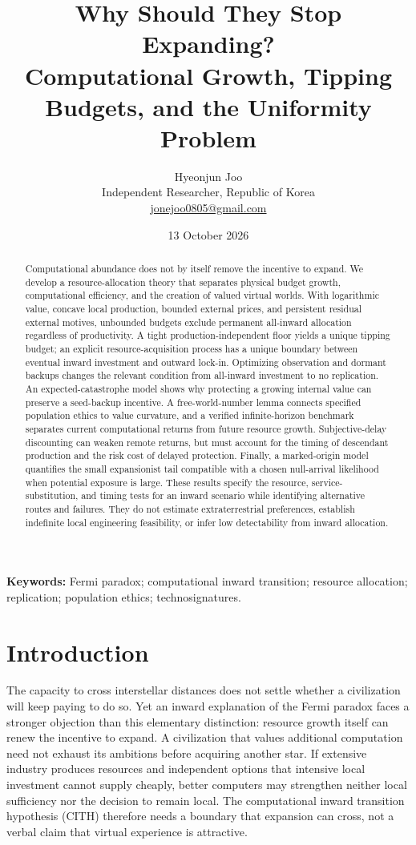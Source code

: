\documentclass[11pt,a4paper]{article}
\title{Why Should They Stop Expanding?\\[3pt]
\large Computational Growth, Tipping Budgets, and the Uniformity Problem}
\author{Hyeonjun Joo\\[3pt]\normalsize Independent Researcher, Republic of Korea\\
\normalsize\href{mailto:jonejoo0805@gmail.com}{jonejoo0805@gmail.com}}
\date{13 October 2026}
\theoremstyle{definition}\newtheorem{definition}{Definition}
\newcommand{\CITH}{\textsc{CITH}}
\begin{document}
\maketitle
\begin{abstract}
Computational abundance does not by itself remove the incentive to expand.
We develop a resource-allocation theory that separates physical budget
growth, computational efficiency, and the creation of valued virtual worlds.
With logarithmic value, concave local production, bounded external prices,
and persistent residual external motives, unbounded budgets exclude
permanent all-inward allocation regardless of productivity. A tight
production-independent floor yields a unique tipping budget; an explicit
resource-acquisition process has a unique boundary between eventual inward
investment and outward lock-in. Optimizing observation and dormant backups
changes the relevant condition from all-inward investment to no replication.
An expected-catastrophe model shows why protecting a growing internal value
can preserve a seed-backup incentive. A free-world-number lemma connects
specified population ethics to value curvature, and a verified
infinite-horizon benchmark separates current computational returns from
future resource growth. Subjective-delay discounting can weaken remote
returns, but must account for the timing of descendant production and the
risk cost of delayed protection. Finally, a marked-origin model quantifies
the small expansionist tail compatible with a chosen null-arrival likelihood
when potential exposure is large. These results specify the resource,
service-substitution, and timing tests for an inward scenario while identifying
alternative routes and failures. They do not estimate extraterrestrial
preferences, establish indefinite local engineering feasibility, or infer
low detectability from inward allocation.
\end{abstract}
\noindent\textbf{Keywords:} Fermi paradox; computational inward transition;
resource allocation; replication; population ethics; technosignatures.

\section{Introduction}
\label{sec:introduction}
The capacity to cross interstellar distances does not settle whether a
civilization will keep paying to do so. Yet an inward explanation of the
Fermi paradox faces a stronger objection than this elementary distinction:
resource growth itself can renew the incentive to expand. A civilization
that values additional computation need not exhaust its ambitions before
acquiring another star. If extensive industry produces resources and
independent options that intensive local investment cannot supply cheaply,
better computers may strengthen neither local sufficiency nor the decision
to remain local. The computational inward transition hypothesis (\CITH)
therefore needs a boundary that expansion can cross, not a verbal claim
that virtual experience is attractive.
\end{document}
